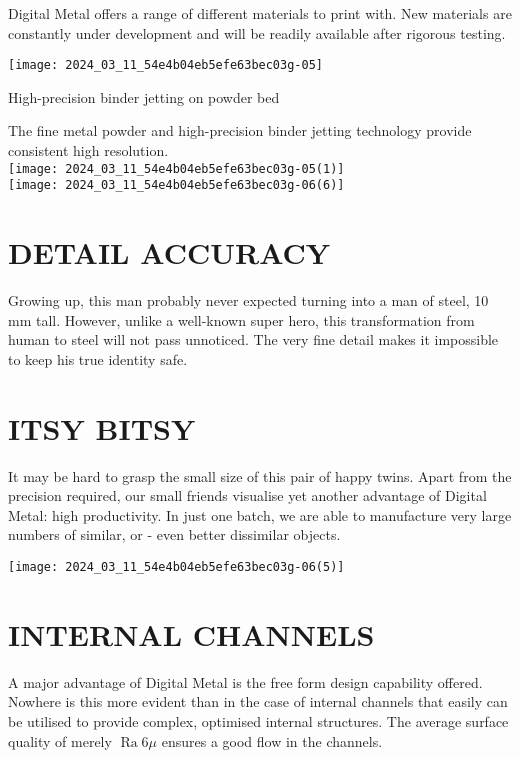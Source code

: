 \documentclass[10pt]{article}
\begin{document}
Digital Metal offers a range of different materials to print with. New materials are constantly under development and will be readily available after rigorous testing.

\begin{center}
\texttt{[image: 2024\_03\_11\_54e4b04eb5efe63bec03g-05]}
\end{center}

High-precision binder jetting on powder bed

The fine metal powder and high-precision binder jetting technology provide consistent high resolution.\\
\texttt{[image: 2024\_03\_11\_54e4b04eb5efe63bec03g-05(1)]}\\
\texttt{[image: 2024\_03\_11\_54e4b04eb5efe63bec03g-06(6)]}

\section*{DETAIL ACCURACY}
Growing up, this man probably never expected turning into a man of steel, 10 mm tall. However, unlike a well-known super hero, this transformation from human to steel will not pass unnoticed. The very fine detail makes it impossible to keep his true identity safe.

\section*{ITSY BITSY}
It may be hard to grasp the small size of this pair of happy twins. Apart from the precision required, our small friends visualise yet another advantage of Digital Metal: high productivity. In just one batch, we are able to manufacture very large numbers of similar, or - even better dissimilar objects.

\begin{center}
\texttt{[image: 2024\_03\_11\_54e4b04eb5efe63bec03g-06(5)]}
\end{center}

\section*{INTERNAL CHANNELS}
A major advantage of Digital Metal is the free form design capability offered. Nowhere is this more evident than in the case of internal channels that easily can be utilised to provide complex, optimised internal structures. The average surface quality of merely $\operatorname{Ra} 6 \mu$ ensures a good flow in the channels.
\end{document}
